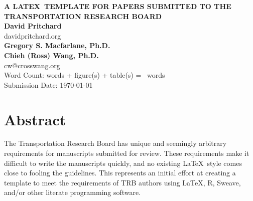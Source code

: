 \documentclass{trb_unofficial}
\author{Pritchard, Macfarlane, and Wang}
\begin{document}
%
%
%
	
\thispagestyle{empty}

\pagewiselinenumbers%

\begin{titlepage}
\begin{flushleft}

{\MakeUppercase{\bfseries A \LaTeX\ Template for Papers Submitted to the Transportation
Research Board}}\\[36pt]

{\bfseries David Pritchard} \\
davidpritchard.org\\[12pt]

{\bfseries Gregory S. Macfarlane, Ph.D.}\\[12pt]

{\bfseries Chieh (Ross) Wang, Ph.D.}\\
cw@crosswang.org\\[60pt]

Word Count: \wordcount words +  figure(s) +  table(s) = \totalwordcount~words\\[12pt] 

Submission Date: \today
\end{flushleft}
\end{titlepage}

\newpage
\section{Abstract}

The Transportation Research Board has unique and seemingly arbitrary
requirements for manuscripts submitted for review. These requirements make it
difficult to write the manuscripts quickly, and no existing \LaTeX\ style comes
close to fooling the guidelines. This represents an initial effort at creating a
template to meet the requirements of TRB authors using \LaTeX, R, Sweave, and/or other
literate programming software.
\end{document}
